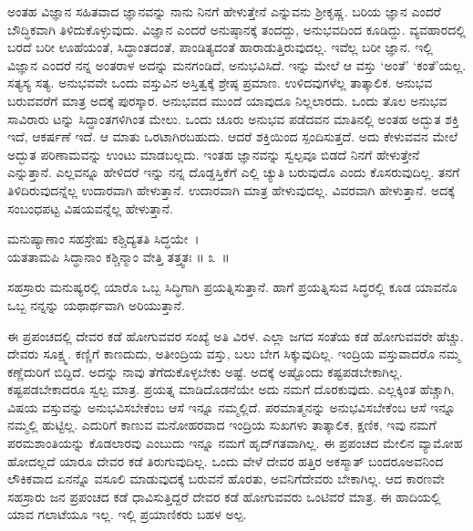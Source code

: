 ಅಂತಹ ವಿಜ್ಞಾನ ಸಹಿತವಾದ ಜ್ಞಾನವನ್ನು ನಾನು ನಿನಗೆ ಹೇಳುತ್ತೇನೆ ಎನ್ನುವನು ಶ‍್ರೀಕೃಷ್ಣ. ಬರಿಯ ಜ್ಞಾನ ಎಂದರೆ ಬೌದ್ಧಿಕವಾಗಿ ತಿಳಿದುಕೊಳ್ಳುವುದು. ವಿಜ್ಞಾನ ಎಂದರೆ ಅನುಷ್ಠಾನಕ್ಕೆ ತಂದದ್ದು, ಅನುಭವದಿಂದ ಕೂಡಿದ್ದು. ವ್ಯವಹಾರದಲ್ಲಿ ಬರದೆ ಬರೀ ಊಹೆಯಂತೆ, ಸಿದ್ಧಾಂತದಂತೆ, ಪಾಂಡಿತ್ಯದಂತೆ ಹಾರಾಡುತ್ತಿರುವುದಲ್ಲ. ಇವೆಲ್ಲ ಬರೀ ಜ್ಞಾನ. ಇಲ್ಲಿ ವಿಜ್ಞಾನ ಎಂದರೆ ನನ್ನ ಅಂತರಾಳ ಅದನ್ನು ಮನಗಂಡಿದೆ, ಅನುಭವಿಸಿದೆ. ಇನ್ನು ಮೇಲೆ ಆ ವಸ್ತು ‘ಅಂತೆ’ ‘ಕಂತೆ’ಯಲ್ಲ. ಸತ್ಯಸ್ಯ ಸತ್ಯ. ಅನುಭವವೇ ಒಂದು ವಸ್ತುವಿನ ಅಸ್ತಿತ್ವಕ್ಕೆ ಶ್ರೇಷ್ಠ ಪ್ರಮಾಣ. ಉಳಿದವುಗಳೆಲ್ಲ ತಾತ್ಕಾಲಿಕ. ಅನುಭವ ಬರುವವರೆಗೆ ಮಾತ್ರ ಅದಕ್ಕೆ ಪುರಸ್ಕಾರ. ಅನುಭವದ ಮುಂದೆ ಯಾವುದೂ ನಿಲ್ಲಲಾರದು. ಒಂದು ತೊಲ ಅನುಭವ ಸಾವಿರಾರು ಟನ್ನು ಸಿದ್ಧಾಂತಗಳಿಗಿಂತ ಮೇಲು. ಒಂದು ಚೂರು ಅನುಭವ ಪಡೆದವನ ಮಾತಿನಲ್ಲಿ ಅಂತಹ ಅದ್ಭುತ ಶಕ್ತಿ ಇದೆ, ಆಕರ್ಷಣೆ ಇದೆ. ಆ ಮಾತು ಒರಟಾಗಿರಬಹುದು. ಆದರೆ ಶಕ್ತಿಯಿಂದ ಸ್ಪಂದಿಸುತ್ತದೆ. ಅದು ಕೇಳುವವನ ಮೇಲೆ ಅದ್ಭುತ ಪರಿಣಾಮವನ್ನು ಉಂಟು ಮಾಡಬಲ್ಲದು. ಇಂತಹ ಜ್ಞಾನವನ್ನು ಸ್ವಲ್ಪವೂ ಬಿಡದೆ ನಿನಗೆ ಹೇಳುತ್ತೇನೆ ಎನ್ನುತ್ತಾನೆ. ಎಲ್ಲವನ್ನೂ ಹೇಳಿದರೆ ಇನ್ನು ನನ್ನ ದೊಡ್ಡಸ್ತಿಕೆಗೆ ಎಲ್ಲಿ ಚ್ಯುತಿ ಬರುವುದೊ ಎಂದು ಕೊಸರುವುದಿಲ್ಲ. ತನಗೆ ತಿಳಿದಿರುವುದನ್ನೆಲ್ಲ ಉದಾರವಾಗಿ ಹೇಳುತ್ತಾನೆ. ಉದಾರವಾಗಿ ಮಾತ್ರ ಹೇಳುವುದಲ್ಲ. ವಿವರವಾಗಿ ಹೇಳುತ್ತಾನೆ. ಅದಕ್ಕೆ ಸಂಬಂಧಪಟ್ಟ ವಿಷಯವನ್ನೆಲ್ಲ ಹೇಳುತ್ತಾನೆ. 

\begin{shloka}
ಮನುಷ್ಯಾಣಾಂ ಸಹಸ್ರೇಷು ಕಶ್ಚಿದ್ಯತತಿ ಸಿದ್ಧಯೇ~।\\ಯತತಾಮಪಿ ಸಿದ್ಧಾನಾಂ ಕಶ್ಚಿನ್ಮಾಂ ವೇತ್ತಿ ತತ್ತ್ವತಃ \hfill॥ ೩~॥
\end{shloka}

\begin{artha}
ಸಹಸ್ರಾರು ಮನುಷ್ಯರಲ್ಲಿ ಯಾರೊ ಒಬ್ಬ ಸಿದ್ಧಿಗಾಗಿ ಪ್ರಯತ್ನಿಸುತ್ತಾನೆ. ಹಾಗೆ ಪ್ರಯತ್ನಿಸುವ ಸಿದ್ಧರಲ್ಲಿ ಕೂಡ ಯಾವನೊ ಒಬ್ಬ ನನ್ನನ್ನು ಯಥಾರ್ಥವಾಗಿ ಅರಿಯುತ್ತಾನೆ.
\end{artha}

ಈ ಪ್ರಪಂಚದಲ್ಲಿ ದೇವರ ಕಡೆ ಹೋಗುವವರ ಸಂಖ್ಯೆ ಅತಿ ವಿರಳ. ಎಲ್ಲಾ ಜಗದ ಸಂತೆಯ ಕಡೆ ಹೋಗುವವರೇ ಹೆಚ್ಚು. ದೇವರು ಸೂಕ್ಷ್ಮ. ಕಣ್ಣಿಗೆ ಕಾಣದುದು, ಅತೀಂದ್ರಿಯ ವಸ್ತು, ಬಲು ಬೇಗ ಸಿಕ್ಕುವುದಿಲ್ಲ. ಇಂದ್ರಿಯ ವಸ್ತುವಾದರೊ ನಮ್ಮ ಕಣ್ಣೆದುರಿಗೆ ಬಿದ್ದಿದೆ. ಅದನ್ನು ನಾವು ತೆಗೆದುಕೊಳ್ಳಬೇಕು ಅಷ್ಟೆ. ಅದಕ್ಕೆ ಅಷ್ಟೊಂದು ಕಷ್ಟಪಡಬೇಕಾಗಿಲ್ಲ. ಕಷ್ಟಪಡಬೇಕಾದರೂ ಸ್ವಲ್ಪ ಮಾತ್ರ. ಪ್ರಯತ್ನ ಮಾಡಿದೊಡನೆಯೇ ಅದು ನಮಗೆ ದೊರಕುವುದು. ಎಲ್ಲಕ್ಕಿಂತ ಹೆಚ್ಚಾಗಿ, ವಿಷಯ ವಸ್ತುವನ್ನು ಅನುಭವಿಸಬೇಕೆಂಬ ಆಸೆ ಇನ್ನೂ ನಮ್ಮಲ್ಲಿದೆ. ಪರಮಾತ್ಮನನ್ನು ಅನುಭವಿಸಬೇಕೆಂಬ ಆಸೆ ಇನ್ನೂ ನಮ್ಮಲ್ಲಿ ಹುಟ್ಟಿಲ್ಲ. ಎದುರಿಗೆ ಕಾಣುವ ಮನೋಹರವಾದ ಇಂದ್ರಿಯ ಸುಖಗಳು ತಾತ್ಕಾಲಿಕ, ಕ್ಷಣಿಕ, ಇವು ನಮಗೆ ಪರಮಶಾಂತಿಯನ್ನು ಕೊಡಲಾರವು ಎಂಬುದು ಇನ್ನೂ ನಮಗೆ ಹೃದ್​ಗತವಾಗಿಲ್ಲ. ಈ ಪ್ರಪಂಚದ ಮೇಲಿನ ವ್ಯಾಮೋಹ ಹೋದಲ್ಲದೆ ಯಾರೂ ದೇವರ ಕಡೆ ತಿರುಗುವುದಿಲ್ಲ. ಒಂದು ವೇಳೆ ದೇವರ ಹತ್ತಿರ ಅಕಸ್ಮಾತ್ ಬಂದರೂ\break ಅವನಿಂದ ಲೌಕಿಕವಾದ ಏನನ್ನೊ ವಸೂಲಿ ಮಾಡುವುದಕ್ಕೆ ಬರುವನೆ ಹೊರತು, ಅವನಿಗೆ\break ದೇವರು ಬೇಕಾಗಿಲ್ಲ. ಆದ ಕಾರಣವೇ ಸಹಸ್ರಾರು ಜನ ಪ್ರಪಂಚದ ಕಡೆ ಧಾವಿಸುತ್ತಿದ್ದರೆ ದೇವರ ಕಡೆ ಹೋಗುವವರು ಒಂಟಿವರೆ ಮಾತ್ರ. ಈ ಹಾದಿಯಲ್ಲಿ ಯಾವ ಗಲಾಟೆಯೂ ಇಲ್ಲ. ಇಲ್ಲಿ ಪ್ರಯಾಣಿಕರು ಬಹಳ ಅಲ್ಪ.

